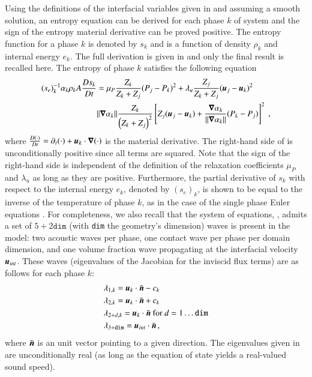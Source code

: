 \documentclass[preprint,10pt]{elsarticle}
\begin{document}
Using the definitions of the interfacial variables given in  and assuming a smooth solution, an entropy equation can be 
derived for each phase $k$ of system  and the sign of the entropy material derivative can be proved positive. 
The entropy function for a phase $k$ is denoted by $s_k$ and is a function of 
density $\rho_k$ and internal energy $e_k$. The full derivation is given in \cite{Marco_paper_sem} and only the final result is recalled here. 
The entropy of phase $k$ satisfies the following equation
%
\begin{align} \label{eq:ent-eqn-7-eqn}
(s_{e})_k^{-1} \alpha_k \rho_k A \frac{Ds_k}{Dt} &= \mu_P \frac{Z_k}{Z_k+Z_j} (P_j - P_k)^2 + \lambda_u \frac{Z_j}{Z_k+Z_j} (\boldsymbol u_j -\boldsymbol u_k)^2 
\nonumber
\\
& \| \boldsymbol\nabla \alpha_k \| \frac{Z_k}{\left( Z_k+Z_j \right)^2} \left[ Z_j (\boldsymbol u_j-\boldsymbol u_k)+\frac{\boldsymbol\nabla \alpha_k}{\| \boldsymbol\nabla \alpha_k \|}(P_k-P_j)\right]^2 \ ,
\end{align}
%
where $\frac{D(\cdot) }{Dt} = \partial_t (\cdot) + \boldsymbol u_k \cdot \boldsymbol\nabla (\cdot)$ is the material derivative.
The right-hand side of  is unconditionally positive since all terms are squared. Note that the sign of the right-hand side is independent of 
the definition of the 
relaxation coefficients $\mu_P$ and $\lambda_u$ as long as they are positive. Furthermore, 
the partial derivative of $s_k$ with respect to the internal energy $e_k$, denoted by $(s_e)_k$, is shown to be equal to the inverse of the temperature 
of phase $k$, as in the case of the single phase Euler equations \cite{jlg, Marco_dissertation}. For completeness, we also recall that the system of equations, 
, 
admits a set of $5+2\texttt{dim}$ (with \texttt{dim} the geometry's dimension) waves 
is present in the model: two acoustic waves per phase, one contact wave per phase per domain dimension, and one volume fraction wave propagating 
at the interfacial velocity $\boldsymbol u_{int}$. These waves (eigenvalues of the Jacobian for the inviscid flux terms) are as follows for each phase $k$:
% 
\begin{align}\label{eq:eigenvalues}
&\lambda_{1,k} = \boldsymbol u_k \cdot \bar{\boldsymbol n} - c_k \nonumber\\
&\lambda_{2,k} = \boldsymbol u_k \cdot \bar{\boldsymbol n} + c_k \nonumber\\
&\lambda_{2+d,k} = \boldsymbol u_k \cdot \bar{\boldsymbol n} \text{ for } d = 1 \dots \texttt{dim} \\
&\lambda_{3+\texttt{dim}} = \boldsymbol u_{int} \cdot \bar{\boldsymbol n} \nonumber \,,
\end{align}
%
where $\bar{\boldsymbol n}$ is an unit vector pointing to a given direction. The eigenvalues given in  are unconditionally 
real (as long as the equation of state yields a real-valued sound speed).
\end{document}

